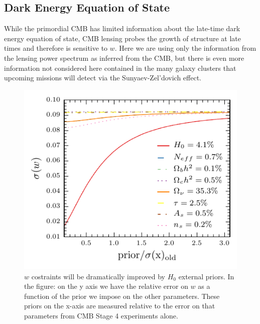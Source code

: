 \documentclass[aps,prd,reprint,superscriptaddress]{revtex4-1}
\begin{document}
%
%
%

\subsection{Dark Energy Equation of State}

While the primordial CMB has limited information about the late-time dark energy equation of state, CMB lensing probes the growth of structure at late times and therefore is sensitive to $w$. Here we are using only the information from the lensing power spectrum as inferred from the CMB, but there is even more information not considered here contained in the many galaxy clusters that upcoming missions will detect via the Sunyaev-Zel'dovich effect. 


\begin{figure}[htbp]
\begin{center}
\includegraphics{prior_w_snow_mass.pdf}
\caption{$w$ costraints will be dramatically improved by $H_{0}$ external priors. 
\footnotesize In the figure: on the y axis we have the relative error on $w$ as a function of the prior we impose on the other parameters. These priors on the x-axis are measured relative to the error on that parameters from CMB Stage 4 experiments alone.}
\label{fig:prior_w}
\end{center}
\end{figure}
\end{document}
